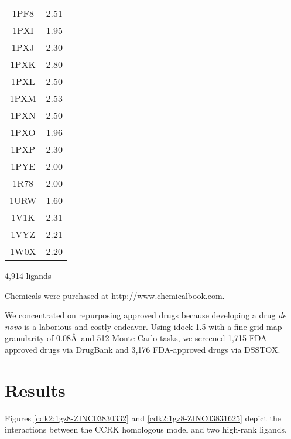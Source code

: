 \begin{table}
\begin{tabular}{cc}
1PF8 & 2.51\\
1PXI & 1.95\\
1PXJ & 2.30\\
1PXK & 2.80\\
1PXL & 2.50\\
1PXM & 2.53\\
1PXN & 2.50\\
1PXO & 1.96\\
1PXP & 2.30\\
1PYE & 2.00\\
1R78 & 2.00\\
1URW & 1.60\\
1V1K & 2.31\\
1VYZ & 2.21\\
1W0X & 2.20\\
\hline
\end{tabular}
\end{table}

4,914 ligands

Chemicals were purchased at http://www.chemicalbook.com.

We concentrated on repurposing approved drugs \citep{944,1023} because developing a drug \textit{de novo} is a laborious and costly endeavor. Using idock 1.5 with a fine grid map granularity of 0.08\AA\ and 512 Monte Carlo tasks, we screened 1,715 FDA-approved drugs via DrugBank and 3,176 FDA-approved drugs via DSSTOX.

\section{Results}

Figures \ref{cdk2:1gz8-ZINC03830332} and \ref{cdk2:1gz8-ZINC03831625} depict the interactions between the CCRK homologous model and two high-rank ligands.


\chapterend
